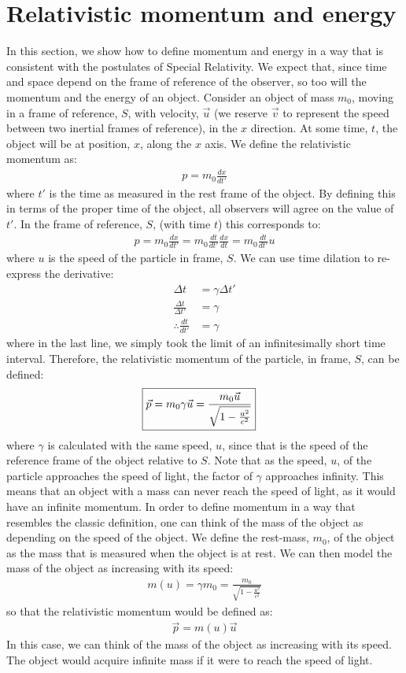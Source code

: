 \section{Relativistic momentum and energy}
In this section, we show how to define momentum and energy in a way that is consistent with the postulates of Special Relativity. We expect that, since time and space depend on the frame of reference of the observer, so too will the momentum and the energy of an object. Consider an object of mass $m_0$, moving in a frame of reference, $S$, with velocity, $\vec u$ (we reserve $\vec v$ to represent the speed between two inertial frames of reference), in the $x$ direction. At some time, $t$, the object will be at position, $x$, along the $x$ axis. We define the relativistic momentum as:
\begin{align*}
p = m_0\frac{dx}{dt'}
\end{align*}
where $t'$ is the time as measured in the rest frame of the object. By defining this in terms of the proper time of the object, all observers will agree on the value of $t'$. In the frame of reference, $S$, (with time $t$) this corresponds to:
\begin{align*}
p = m_0\frac{dx}{dt'}=m_0\frac{dt}{dt'}\frac{dx}{dt}=m_0\frac{dt}{dt'}u
\end{align*}
where $u$ is the speed of the particle in frame, $S$. We can use time dilation to re-express the derivative:
\begin{align*}
\Delta t &= \gamma \Delta t'\\
\frac{\Delta t}{\Delta t'}&=\gamma\\
\therefore \frac{dt}{dt'}&=\gamma
\end{align*}
where in the last line, we simply took the limit of an infinitesimally short time interval. Therefore, the relativistic momentum of the particle, in frame, $S$, can be defined:
\begin{align*}
\Aboxed{\vec p = m_0\gamma\vec u =  \frac{m_0\vec u}{\sqrt{1-\frac{u^2}{c^2}}} }
\end{align*}
where $\gamma$ is calculated with the same speed, $u$, since that is the speed of the reference frame of the object relative to $S$. Note that as the speed, $u$, of the particle approaches the speed of light, the factor of $\gamma$ approaches infinity. This means that an object with a mass can never reach the speed of light, as it would have an infinite momentum. In order to define momentum in a way that resembles the classic definition, one can think of the mass of the object as depending on the speed of the object. We define the rest-mass, $m_0$, of the object as the mass that is measured when the object is at rest. We can then model the mass of the object as increasing with its speed:
\begin{align*}
m(u) = \gamma m_0 = \frac{m_0}{\sqrt{1-\frac{u^2}{c^2}}}
\end{align*}
so that the relativistic momentum would be defined as:
\begin{align*}
\vec p = m(u)\vec u
\end{align*}
In this case, we can think of the mass of the object as increasing with its speed. The object would acquire infinite mass if it were to reach the speed of light.

